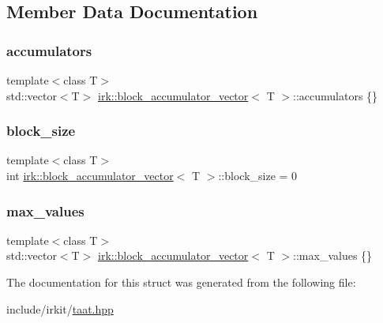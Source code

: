 \subsection{Member Data Documentation}
\mbox{\label{structirk_1_1block__accumulator__vector_af19b689aa80c58cbcc788fc5b11d0de1}} 
\subsubsection{\texorpdfstring{accumulators}{accumulators}}
{\footnotesize\ttfamily template$<$class T$>$ \\
std\+::vector$<$T$>$ \mbox{\hyperlink{structirk_1_1block__accumulator__vector}{irk\+::block\+\_\+accumulator\+\_\+vector}}$<$ T $>$\+::accumulators \{\}}

\mbox{\label{structirk_1_1block__accumulator__vector_a4465eab1938c5f607b647e6042fe66c8}} 
\subsubsection{\texorpdfstring{block\+\_\+size}{block\_size}}
{\footnotesize\ttfamily template$<$class T$>$ \\
int \mbox{\hyperlink{structirk_1_1block__accumulator__vector}{irk\+::block\+\_\+accumulator\+\_\+vector}}$<$ T $>$\+::block\+\_\+size = 0}

\mbox{\label{structirk_1_1block__accumulator__vector_a63e09374714113ce080afdc39aaa582c}} 
\subsubsection{\texorpdfstring{max\+\_\+values}{max\_values}}
{\footnotesize\ttfamily template$<$class T$>$ \\
std\+::vector$<$T$>$ \mbox{\hyperlink{structirk_1_1block__accumulator__vector}{irk\+::block\+\_\+accumulator\+\_\+vector}}$<$ T $>$\+::max\+\_\+values \{\}}



The documentation for this struct was generated from the following file\+:\begin{DoxyCompactItemize}
\item 
include/irkit/\mbox{\hyperlink{taat_8hpp}{taat.\+hpp}}\end{DoxyCompactItemize}
